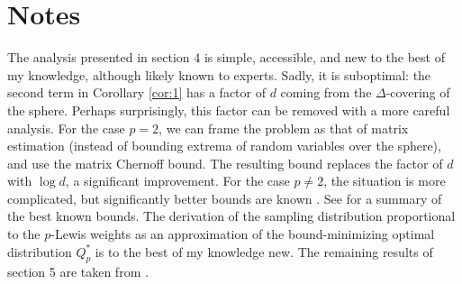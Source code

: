 \documentclass{article}
\theoremstyle{plain}
\theoremstyle{definition}
\theoremstyle{remark}
\begin{document}
\section*{Notes}
The analysis presented in section 4 is simple, accessible, and new to the best of my knowledge, although likely known to experts. Sadly, it is suboptimal: the second term in Corollary \ref{cor:1} has a factor of $d$ coming from the $\Delta$-covering of the sphere. Perhaps surprisingly, this factor can be removed with a more careful analysis. For the case $p=2$, we can frame the problem as that of matrix estimation (instead of bounding extrema of random variables over the sphere), and use the matrix Chernoff bound. The resulting bound replaces the factor of $d$ with $\log{d}$, a significant improvement. For the case $p \neq 2$, the situation is more complicated, but significantly better bounds are known \cite{bourgain1989approximation, talagrand1990embedding, talagrand1995embedding}. See \cite{cohen2015lp} for a summary of the best known bounds. 
The derivation of the sampling distribution proportional to the $p$-Lewis weights as an approximation of the bound-minimizing optimal distribution $Q_p^{*}$ is to the best of my knowledge new. The remaining results of section 5 are taken from \cite{cohen2015lp}.

\newpage
\nocite{*}


\end{document}
